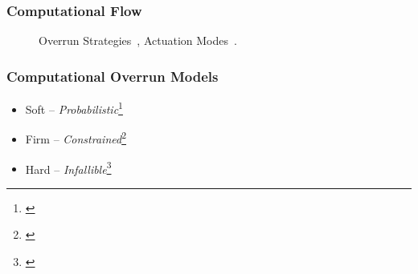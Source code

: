 \begin{frame}
    \frametitle{Computational Flow}
    \begin{figure}[h]
        \centering
        \only<2>{}%
        \only<3>{}%
        \caption{Overrun Strategies~\parencite{Cervin:2005}, Actuation Modes~\parencite{Schenato:2009}.}
    \end{figure}
\end{frame}

\begin{frame}
    \frametitle{Computational Overrun Models}
    \begin{itemize}\setlength\itemsep{1em}
        \item \textcolor<2>{hicolour!50!white}{Soft -- \emph{Probabilistic}\footnote{\cite{Buttazzo:2005, Manolache:2004, vonderBrueggen:2021}}}
        \item \textcolor<2>{hicolour}{Firm -- \emph{Constrained}\footnote{\cite{Koren:1995, Bernat:2001}}}
        \item<1> Hard -- \emph{Infallible}\footnote{\cite{Liu:1973}}
    \end{itemize}
\end{frame}

